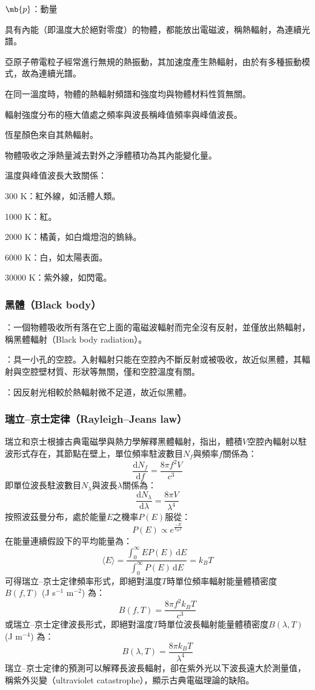 \documentclass[a4paper,12pt]{article}
\begin{document}
\item $\mb{p}$：動量
\eit
{}
\bit
\item 具有內能（即溫度大於絕對零度）的物體，都能放出電磁波，稱熱輻射，為連續光譜。
\item 亞原子帶電粒子經常進行無規的熱振動，其加速度產生熱輻射，由於有多種振動模式，故為連續光譜。
\item 在同一溫度時，物體的熱輻射頻譜和強度均與物體材料性質無關。
\item 輻射強度分布的極大值處之頻率與波長稱峰值頻率與峰值波長。
\item 恆星顏色來自其熱輻射。
\item 物體吸收之淨熱量減去對外之淨體積功為其內能變化量。
\item 溫度與峰值波長大致關係：
\bit
\item 300 K：紅外線，如活體人類。
\item 1000 K：紅。
\item 2000 K：橘黃，如白熾燈泡的鎢絲。
\item 6000 K：白，如太陽表面。
\item 30000 K：紫外線，如閃電。
\eit
\eit
\subsubsection{黑體（Black body）}
\bit 
\item {}：一個物體吸收所有落在它上面的電磁波輻射而完全沒有反射，並僅放出熱輻射，稱黑體輻射（Black body radiation）。
\item {}：具一小孔的空腔。入射輻射只能在空腔內不斷反射或被吸收，故近似黑體，其輻射與空腔壁材質、形狀等無關，僅和空腔溫度有關。
\item {}：因反射光相較於熱輻射微不足道，故近似黑體。
\eit
\subsubsection{瑞立–京士定律（Rayleigh–Jeans law）}
瑞立和京士根據古典電磁學與熱力學解釋黑體輻射，指出，體積$V$空腔內輻射以駐波形式存在，其節點在壁上，單位頻率駐波數目$N_f$與頻率$f$關係為：
\[\frac{\mathrm{d}N_f}{\mathrm{d}f}=\frac{8\pi f^2V}{c^3}\]
即單位波長駐波數目$N_{\lambda}$與波長$\lambda$關係為：
\[\frac{\mathrm{d}N_{\lambda}}{\mathrm{d}\lambda}=\frac{8\pi V}{\lambda^4}\]
按照波茲曼分布，處於能量$E$之機率$P(E)$服從：
\[P(E)\propto e^{\frac{-E}{k_BT}}\]
在能量連續假設下的平均能量為：
\[\langle E\rangle=\frac{\int_0^{\infty}EP(E)\,\mathrm{d}E}{\int_0^{\infty}P(E)\,\mathrm{d}E}=k_BT\]
可得瑞立–京士定律頻率形式，即絕對溫度$T$時單位頻率輻射能量體積密度$B(f,T)$ (J s$^{-1}$ m$^{-2}$) 為：
\[B(f,T)=\frac{8\pi f^2k_BT}{c^3}\]
或瑞立–京士定律波長形式，即絕對溫度$T$時單位波長輻射能量體積密度$B(\lambda,T)$ (J m$^{-4}$) 為：
\[B(\lambda,T)=\frac{8\pi k_BT}{\lambda^4}\]
瑞立–京士定律的預測可以解釋長波長輻射，卻在紫外光以下波長遠大於測量值，稱紫外災變（ultraviolet catastrophe），顯示古典電磁理論的缺陷。
\end{document}
